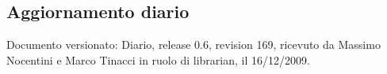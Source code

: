 \subsection{Aggiornamento diario}
Documento versionato: Diario, release 0.6, revision 169, ricevuto da Massimo 
Nocentini e Marco Tinacci in ruolo di librarian, il 16/12/2009. 